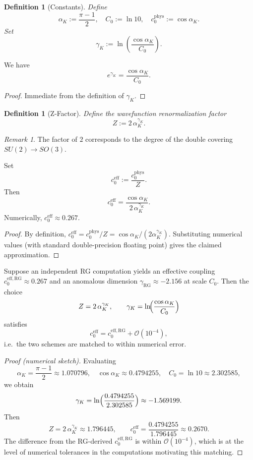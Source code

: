 \documentclass[11pt]{article}
\newtheorem{definition}[theorem]{Definition}
\theoremstyle{remark}
\newtheorem{remark}[theorem]{Remark}
\begin{document}
\begin{definition}[Constants]
Define
\[
  \alpha_K := \frac{\pi-1}{2},\quad
  C_0 := \ln 10,\quad
  c_0^{\mathrm{phys}} := \cos\alpha_K.
\]
Set
\[
  \gamma_K := \ln\!\left(\frac{\cos\alpha_K}{C_0}\right).
\]
\end{definition}

\begin{lemma}
We have
\[
  e^{\gamma_K} = \frac{\cos\alpha_K}{C_0}.
\]
\end{lemma}

\begin{proof}
Immediate from the definition of $\gamma_K$.
\end{proof}

\begin{definition}[Z-Factor]
Define the wavefunction renormalization factor
\[
  Z := 2\,\alpha_K^{\gamma_K}.
\]
\end{definition}

\begin{remark}
The factor of $2$ corresponds to the degree of the double covering
$SU(2)\to SO(3)$.
\end{remark}

\begin{lemma}
Set
\[
  c_0^{\mathrm{eff}} := \frac{c_0^{\mathrm{phys}}}{Z}.
\]
Then
\[
  c_0^{\mathrm{eff}} = \frac{\cos\alpha_K}{2\,\alpha_K^{\gamma_K}}.
\]
Numerically, $c_0^{\mathrm{eff}}\approx 0.267$.
\end{lemma}

\begin{proof}
By definition,
$c_0^{\mathrm{eff}} = c_0^{\mathrm{phys}} / Z = \cos\alpha_K/(2\alpha_K^{\gamma_K})$.
Substituting numerical values (with standard double-precision floating point)
gives the claimed approximation.
\end{proof}

\begin{proposition}
Suppose an independent RG computation yields an effective coupling
$c_0^{\mathrm{eff,RG}}\approx0.267$ and an anomalous dimension
$\gamma_{\mathrm{RG}}\approx -2.156$ at scale $C_0$. Then the choice
\[
  Z = 2\,\alpha_K^{\gamma_K}, \qquad
  \gamma_K = \ln\!\Bigl(\frac{\cos\alpha_K}{C_0}\Bigr)
\]
satisfies
\[
  c_0^{\mathrm{eff}} = c_0^{\mathrm{eff,RG}} + \mathcal{O}(10^{-4}),
\]
i.e.\ the two schemes are matched to within numerical error.
\end{proposition}

\begin{proof}[Proof (numerical sketch)]
Evaluating
\[
  \alpha_K = \frac{\pi-1}{2}\approx1.070796,\quad
  \cos\alpha_K\approx0.4794255,\quad
  C_0=\ln 10\approx2.302585,
\]
we obtain
\[
  \gamma_K = \ln\Bigl(\frac{0.4794255}{2.302585}\Bigr)\approx -1.569199.
\]
Then
\[
  Z = 2\,\alpha_K^{\gamma_K}
    \approx 1.796445,\qquad
  c_0^{\mathrm{eff}}=\frac{0.4794255}{1.796445}\approx0.2670.
\]
The difference from the RG-derived $c_0^{\mathrm{eff,RG}}$ is within
$\mathcal{O}(10^{-4})$, which is at the level of numerical tolerances in the
computations motivating this matching.
\end{proof}
\end{document}
